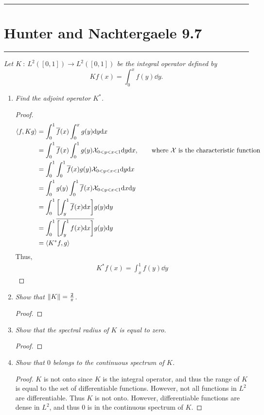 \documentclass{article} %
\theoremstyle{plain}
\newcommand{\VEC}[2]{\left\langle #1, #2 \right\rangle}
\newcommand{\problem}[1]{
\vspace{.375cm}
\begin{minipage}{\textwidth}
    \begin{center}
        \noindent\rule{5cm}{1pt}
    \end{center}
    \section{\bf #1}
    \begin{center}
        \noindent\rule{5cm}{1pt}
    \end{center}
    \vspace{0.25cm}
\end{minipage}
}
\numberwithin{equation}{section} %
\numberwithin{figure}{section} %
\numberwithin{table}{section} %
\begin{document}
\problem{Hunter and Nachtergaele 9.7}
\emph{Let $K\ :\ L^2([0,1]) \rightarrow L^2([0,1])$ be the integral operator defined by $$Kf(x) = \int_0^x f(y) \dd y.$$}
\begin{enumerate}[\it a)]
    \item
        \emph{Find the adjoint operator $K^*$.}
        \begin{proof}
            \begin{align*}
                \VEC{f}{Kg} &= \int_0^1 \overline{f}(x)\int_0^x g(y)\dd y \dd x \\
                &= \int_0^1 \overline{f}(x)\int_0^1 g(y)\mathcal{X}_{0 < y < x < 1}\dd y \dd x, \qquad \text{where $\mathcal{X}$ is the characteristic function} \\
                &= \int_0^1 \int_0^1 \overline{f}(x)g(y)\mathcal{X}_{0<y<x<1}\dd y \dd x \\
                &= \int_0^1 g(y) \int_0^1 \overline{f}(x)\mathcal{X}_{0<y<x<1}\dd x \dd y \\
                &= \int_0^1 \qty[\int_y^1 \overline{f}(x)\dd x]g(y) \dd y \\
                &= \int_0^1 \overline{\qty[\int_y^1 f(x)\dd x]}g(y) \dd y \\
                &= \VEC{K^* f}{g}
            \end{align*}
            Thus,
            \begin{align*}
                K^*f(x) = \int_x^1 f(y)\dd y
            \end{align*}
        \end{proof}
    \item
        \emph{Show that $\norm{K} = \frac{2}{\pi}$.}
        \begin{proof}
        \end{proof}
    \item
        \emph{Show that the spectral radius of $K$ is equal to zero.}
        \begin{proof}
        \end{proof}
    \item
        \emph{Show that $0$ belongs to the continuous spectrum of $K$.}
        \begin{proof}
            $K$ is not onto since $K$ is the integral operator, and thus the range of $K$ is equal to the set of differentiable functions.  However, not all functions in $L^2$ are differentiable.  Thus $K$ is not onto.  However, differentiable functions are dense in $L^2$, and thus $0$ is in the continuous spectrum of $K$.
        \end{proof}
\end{enumerate}
\end{document}
